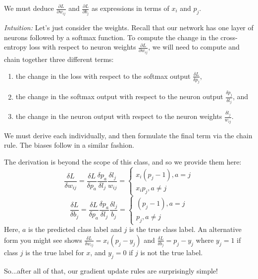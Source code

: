 We must deduce $\frac{\partial L}{\partial w_{ij}}$ and $\frac{\partial L}{\partial b_j}$ as expressions in terms of $x_i$ and $p_j$.

\emph{Intuition:} Let's just consider the weights. Recall that our network has one layer of neurons followed by a softmax function. To compute the change in the cross-entropy loss with respect to neuron weights $\frac{\partial L}{\partial w_{ij}}$, we will need to compute and chain together three different terms:
\begin{enumerate}
\itemsep0em 
\listparindent0em
\topsep0em
\parsep0em
\partopsep0em
\item the change in the loss with respect to the softmax output $\frac{\delta L}{\delta p_j}$, 
\item the change in the softmax output with respect to the neuron output $\frac{\delta p_j}{\delta l_j}$, and
\item the change in the neuron output with respect to the neuron weights $\frac{\delta l_j}{w_{ij}}$.
\end{enumerate}
We must derive each individually, and then formulate the final term via the chain rule. The biases follow in a similar fashion.

The derivation is beyond the scope of this class, and so we provide them here:
\begin{equation}
\frac{\delta L}{\delta w_{ij}} = \frac{\delta L}{\delta p_a} \frac{\delta p_a}{\delta l_j} \frac{\delta l_j}{w_{ij}} =\begin{cases}
x_i(p_j-1), a = j\\
x_ip_j,  a\neq j
\end{cases}
\label{eq:wupdate}
\end{equation}
\begin{equation}
\frac{\delta L}{\delta b_j} = \frac{\delta L}{\delta p_a} \frac{\delta p_a}{\delta l_j} \frac{\delta l_j}{b_j} =\begin{cases}
(p_j-1), a = j\\
p_j,  a\neq j
\end{cases}
\label{eq:bupdate}
\end{equation}
Here, $a$ is the predicted class label and $j$ is the true class label. An alternative form you might see shows $\frac{\delta L}{\delta w_{ij}} = x_i(p_j-y_j)$ and $\frac{\delta L}{\delta b_j} = p_j-y_j$ where $y_j=1$ if class $j$ is the true label for $x$, and $y_j = 0$ if $j$ is not the true label.

So...after all of that, our gradient update rules are surprisingly simple!

